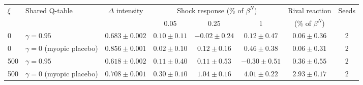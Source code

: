 \begin{tabular}{llcccccc}
\toprule
$\xi$ & Shared Q-table & $\Delta$ intensity & \multicolumn{3}{c}{Shock response (\% of $\beta^N$)} & Rival reaction & Seeds \\
 & & & 0.05 & 0.25 & 1 & (\% of $\beta^N$) & \\
\midrule
0 & $\gamma=0.95$ & $0.683 \pm 0.002$ & $0.10 \pm 0.11$ & $-0.02 \pm 0.24$ & $0.12 \pm 0.47$ & $0.06 \pm 0.36$ & 2 \\
0 & $\gamma=0$ (myopic placebo) & $0.856 \pm 0.001$ & $0.02 \pm 0.10$ & $0.12 \pm 0.16$ & $0.46 \pm 0.38$ & $0.06 \pm 0.31$ & 2 \\
500 & $\gamma=0.95$ & $0.618 \pm 0.002$ & $0.11 \pm 0.40$ & $0.11 \pm 0.53$ & $-0.30 \pm 0.51$ & $0.36 \pm 0.55$ & 2 \\
500 & $\gamma=0$ (myopic placebo) & $0.708 \pm 0.001$ & $0.30 \pm 0.10$ & $1.04 \pm 0.16$ & $4.01 \pm 0.22$ & $2.93 \pm 0.17$ & 2 \\
\bottomrule
\end{tabular}